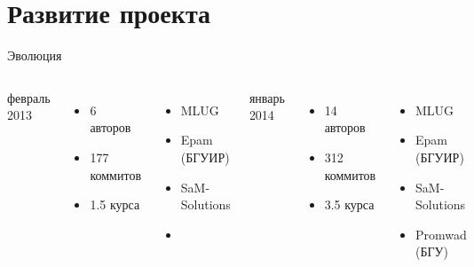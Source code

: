 \section{Развитие проекта}
\begin{frame}[fragile]{Эволюция}

  \begin{columns}


	  \begin{center}
		{\Large февраль 2013}
	  \end{center}

	  \begin{itemize}
		\item 6 авторов
		\item 177 коммитов
		\item 1.5 курса
	  \end{itemize}

	  \begin{itemize}
		\item MLUG
		\item Epam (БГУИР)
		\item SaM-Solutions
		\item[]
	  \end{itemize}


	  \begin{center}
		{\Large январь 2014}
	  \end{center}

	  \begin{itemize}
		\item 14 авторов
		\item 312 коммитов
		\item 3.5 курса
	  \end{itemize}

	  \begin{itemize}
		\item MLUG
		\item Epam (БГУИР)
		\item SaM-Solutions
		\item Promwad (БГУ)
	  \end{itemize}

  \end{columns}

\end{frame}
